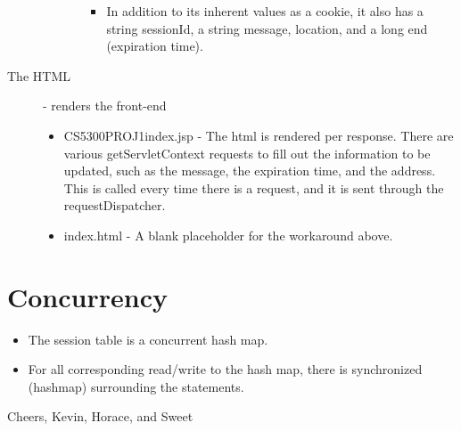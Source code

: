 \documentclass{article}
\begin{document}
\begin{description}
\begin{itemize}
\begin{itemize}
\begin{itemize}
                \item   In addition to its inherent values as a cookie, it also has a string sessionId, a string message, location, and a long end (expiration time). 
              \end{itemize}
          \end{itemize}    
      \end{itemize}
    \item[The HTML] - renders the front-end 
      \begin{itemize}
        \item CS5300PROJ1index.jsp - The html is rendered per response. There are various getServletContext requests to fill out the information to be updated, such as the message, the expiration time, and the address. This is called every time there is a request, and it is sent through the requestDispatcher.
        \item index.html - A blank placeholder for the workaround above.
      \end{itemize}

  \end{description}

\section{Concurrency}
  \begin{itemize}
	  \item The session table is a concurrent hash map.
    \item For all corresponding read/write to the hash map, there is synchronized (hashmap) surrounding the statements.
  \end{itemize}

Cheers, 
Kevin, Horace, and Sweet
\end{document}
